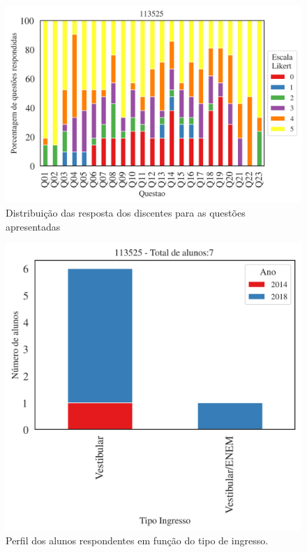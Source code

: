 \documentclass[a4paper,10pt]{article}
\begin{document}
\begin{figure}[h]
\centering
\includegraphics[width=0.85\linewidth]{resposta_questoes_curso_113525}
\caption{\label{fig:qalunos}Distribuição das resposta dos discentes para as questões apresentadas}
\end{figure}
\begin{figure}[h]
\centering
\includegraphics[width=0.7\linewidth]{ingresso_discentes_curso_ano_113525}
\caption{\label{fig:ingressoano} Perfil  dos alunos respondentes em função do tipo de ingresso.}
\end{figure}
\end{document}
